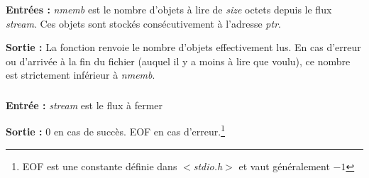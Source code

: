 \documentclass[../../../main.tex]{subfiles}
\begin{document}
\subsubsection{}
\textbf{Entrées :}\newline
\textit{nmemb} est le nombre d'objets à lire de \textit{size} octets depuis le flux \textit{stream}. Ces objets sont stockés consécutivement à l'adresse \textit{ptr}.
 
\textbf{Sortie :} La fonction renvoie le nombre d'objets effectivement lus. En cas d'erreur ou d'arrivée à la fin du fichier (auquel il y a moins à lire que voulu), ce nombre est strictement inférieur à \textit{nmemb}.
\subsubsection{}
\textbf{Entrée :} \textit{stream} est le flux à fermer
 
\textbf{Sortie :} 0 en cas de succès. \textsf{EOF} en cas d'erreur.\footnote{\textsf{EOF} est une constante définie dans \textit{$<$stdio.h$>$} et vaut généralement $-1$}
\end{document}
